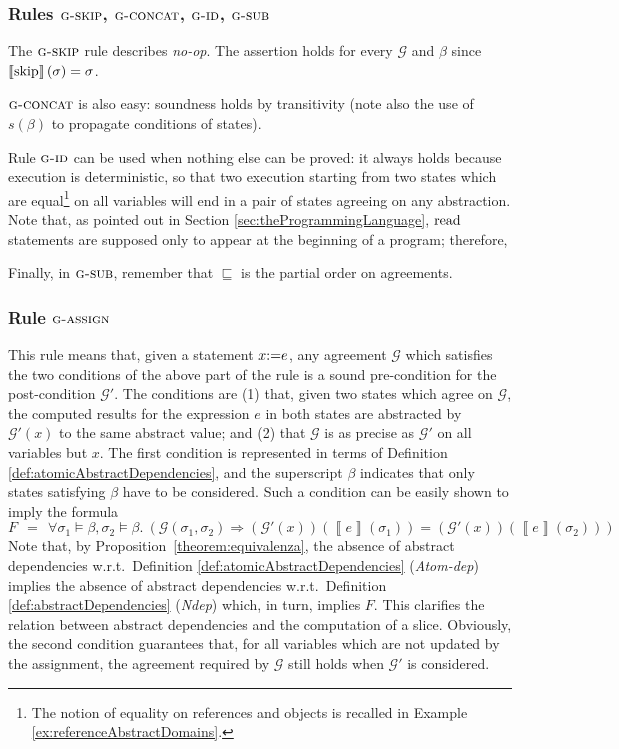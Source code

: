 \documentclass[prodmode,acmtocl]{acmsmall}
\def\state{\ensuremath{\sigma}\xspace}
\newcommand{\0}{\mbox{\bf 0}}
\newcommand{\CODE}[1]{\ensuremath{\mbox{\lstinline!#1!}\xspace}\xspace}
\newcommand{\SEMANTICS}[1]{\left\llbracket #1 \right\rrbracket}
\def\PRED{\beta}
\def\AGREEM{\mathcal{G}}
\newcommand{\GRULENAME}[1]{\textsc{g-#1}}
\begin{document}
\subsubsection{Rules $\GRULENAME{skip}$, $\GRULENAME{concat}$,
  $\GRULENAME{id}$, $\GRULENAME{sub}$}

The $\GRULENAME{skip}$ rule describes \emph{no-op}.  The assertion
holds for every $\AGREEM$ and $\PRED$ since
$\SEMANTICS{\mbox{\CODE{skip}}}(\state) = \state$.

$\GRULENAME{concat}$ is also easy: soundness holds by transitivity
(note also the use of $s(\PRED)$ to propagate conditions of states).

Rule $\GRULENAME{id}$ can be used when nothing else can be proved: it
always holds because execution is deterministic, so that two execution
starting from two states which are equal\footnote{The notion of
  equality on references and objects is recalled in Example
  \ref{ex:referenceAbstractDomains}.} on all variables will end in a
pair of states agreeing on any abstraction.  Note that, as pointed out
in Section \ref{sec:theProgrammingLanguage}, \CODE{read} statements
are supposed only to appear at the beginning of a program; therefore,

Finally, in $\GRULENAME{sub}$, remember that $\sqsubseteq$ is the
partial order on agreements.

\subsubsection{Rule $\GRULENAME{assign}$}

This rule means that, given a statement $x
\mbox{\CODE{:=}} e$, any agreement $\AGREEM$ which satisfies the two
conditions of the above part of the rule is a sound pre-condition for
the post-condition $\AGREEM'$.  The conditions are (1) that, given two
states which agree on $\AGREEM$, the computed results for the
expression $e$ in both states are abstracted by $\AGREEM'(x)$ to the
same abstract value; and (2) that $\AGREEM$ is as precise as
$\AGREEM'$ on all variables but $x$.  The first condition is
represented in terms of Definition
\ref{def:atomicAbstractDependencies}, and the superscript $\PRED$
indicates that only states satisfying $\PRED$ have to be considered.
Such a condition can be easily shown to imply the formula
\[ F
~~=~~ \forall \state_1 \models \PRED,\state_2 \models \PRED.~\left(\AGREEM(\sigma_1,\sigma_2) \Rightarrow
(\AGREEM'(x))(\SEMANTICS{e}(\state_1)) =
(\AGREEM'(x))(\SEMANTICS{e}(\state_2))\right) \] Note that, by Proposition~\ref{theorem:equivalenza}, the absence of abstract dependencies
w.r.t.~Definition \ref{def:atomicAbstractDependencies}
(\emph{Atom-dep}) implies the absence of abstract dependencies
w.r.t.~Definition \ref{def:abstractDependencies} (\emph{Ndep}) which,
in turn, implies $F$.  This clarifies the relation between abstract
dependencies and the computation of a slice.  Obviously, the second
condition guarantees that, for all variables which are not updated by
the assignment, the agreement required by $\AGREEM$ still holds when
$\AGREEM'$ is considered.
\end{document}
